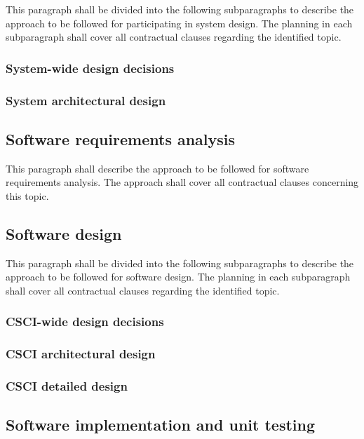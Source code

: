 \documentclass{fidata-report-template}
\begin{document}
This paragraph shall be divided into the following subparagraphs to
describe the approach to be followed for participating in system design.
The planning in each subparagraph shall cover all contractual clauses
regarding the identified topic.

\subsubsection{System-wide design decisions}
\subsubsection{System architectural design}

\subsection{Software requirements analysis}

This paragraph shall describe the approach to be followed for software
requirements analysis. The approach shall cover all contractual clauses
concerning this topic.

\subsection{Software design}

This paragraph shall be divided into the following subparagraphs to
describe the approach to be followed for software design. The planning
in each subparagraph shall cover all contractual clauses regarding the
identified topic.

\subsubsection{CSCI-wide design decisions}

\subsubsection{CSCI architectural design}

\subsubsection{CSCI detailed design}

\subsection{Software implementation and unit testing}
\end{document}
